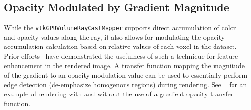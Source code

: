 \subsection{Opacity Modulated by Gradient Magnitude}
\label{opacity-modulated-by-gradient-magnitude}
While the \texttt{vtkGPUVolumeRayCastMapper} supports direct accumulation of
color and opacity values along the ray, it also allows for modulating the
opacity accumulation calculation based on relative values of each voxel in the
dataset. Prior efforts~\citep{marchesin_per-pixel_2010} have demonstrated the
usefulness of such a technique for feature enhancement in the rendered image. A
transfer function mapping the magnitude of the gradient to an opacity modulation
value can be used to essentially perform edge detection (de-emphasize homogenous
regions) during rendering. See ~ for an example of
rendering with and without the use of a gradient opacity transfer function.

